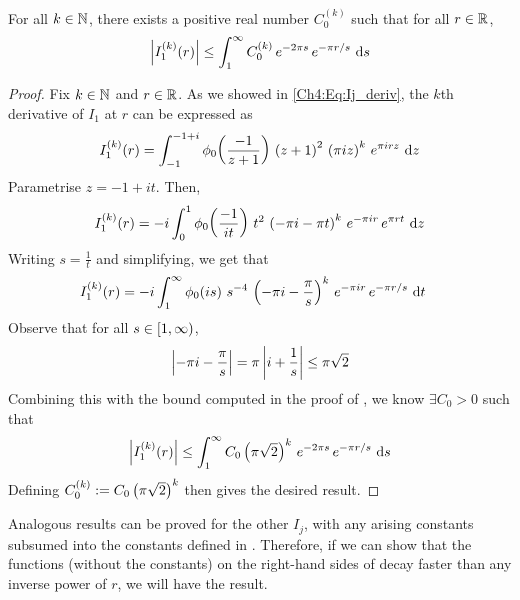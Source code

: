 \begin{boxlemma}
    For all $k \in \mathbb{N}$, there exists a positive real number $C_0^{(k)}$ such that for all $r \in \mathbb{R}$,
    \begin{align*}
        \left\lvert I_1^{(k)}\!\left( r \right) \right\rvert \leq \int_{1}^{\infty} C_0^{(k)} \, e^{-2\pi s} \, e^{- \pi r / s} \, \operatorname{d}\!{s}
    \end{align*}
\end{boxlemma}
\begin{proof}
    Fix $k \in \mathbb{N}$ and $r \in \mathbb{R}$. As we showed in \eqref{Ch4:Eq:Ij_deriv}, the $k$th derivative of $I_1$ at $r$ can be expressed as
    \begin{align*}
        I_1^{(k)}\!\left( r \right) = \int_{-1}^{-1+i} \phi_0\!\left( \frac{-1}{z+1} \right) \, \left( z+1 \right)^2 \, \left( \pi i z \right)^k \, e^{\pi i r z} \, \operatorname{d}\!{z}
    \end{align*}
    Parametrise $z = -1 + it$. Then,
    \begin{align*}
        I_1^{(k)}\!\left( r \right) = -i \int_{0}^{1} \phi_0\!\left( \frac{-1}{it} \right) \, t^2 \, \left( -\pi i - \pi t \right)^k \, e^{-\pi i r} \, e^{\pi r t} \, \operatorname{d}\!{z}
    \end{align*}
    Writing $s = \frac{1}{t}$ and simplifying, we get that
    \begin{align*}
        I_1^{(k)}\!\left( r \right) &= -i \int_{1}^{\infty}
            \phi_0\!\left( is \right) \,
            s^{-4} \,
            \left( -\pi i - \frac{\pi}{s} \right)^k \,
            e^{-\pi i r} \,
            e^{-\pi r / s}\,
            \operatorname{d}\!{t}
    \end{align*}
    Observe that for all $s \in \left[1, \infty\right)$,
    \begin{align*}
        \left\lvert -\pi i - \frac{\pi}{s} \right\rvert = \pi \left\lvert i + \frac{1}{s} \right\rvert \leq \pi \sqrt{2}
    \end{align*}
    Combining this with the bound computed in the proof of , we know $\exists C_0 > 0$ such that
    \begin{align*}
        \left\lvert I_1^{(k)}\!\left( r \right) \right\rvert \leq \int_{1}^{\infty} C_0 \left( \pi \sqrt{2} \right)^{k} \, e^{-2\pi s} \, e^{- \pi r / s} \, \operatorname{d}\!{s}
    \end{align*}
    Defining $C_0^{(k)} := C_0 \left( \pi \sqrt{2} \right)^{k}$ then gives the desired result.
\end{proof}

Analogous results can be proved for the other $I_j$, with any arising constants subsumed into the constants defined in . Therefore, if we can show that the functions (without the constants) on the right-hand sides of  decay faster than any inverse power of $r$, we will have the result.

